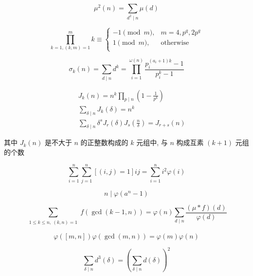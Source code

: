 \begin{equation}
    \mu^2(n) = \sum_{d^2 \mid n} \mu (d)
\end{equation}

\begin{equation}
    \prod_{k=1,(k, m) = 1}^{m} k \equiv
    \begin{cases}
        -1 \pmod m, & m = 4, p^q, 2p^q \\
        1 \pmod m,  & \text{otherwise} \\
    \end{cases}
\end{equation}

\begin{equation}
    \sigma_k(n) = \sum_{d\mid n}d^k = \prod_{i=1}^{\omega(n)}\frac{p_i^{(a_i+1)k}-1}{p_i^k-1}
\end{equation}

\begin{eqnarray}
    &&J_k(n) = n^k\prod_{p\mid n}\left(1-\frac{1}{p^k}\right) \\
    &&\sum_{\delta\mid n}J_k(\delta) = n^k \\
    &&\sum_{\delta\mid n}\delta^sJ_r(\delta)J_s\left(\frac{n}{\delta}\right) = J_{r+s}(n)
\end{eqnarray}

其中 \(J_k(n)\) 是不大于 \(n\) 的正整数构成的 \(k\) 元组中, 与 \(n\) 构成互素 \((k + 1)\) 元组的个数

\begin{equation}
    \sum_{i=1}^{n} \sum_{j=1}^{n} [(i,j)=1]ij =  \sum_{i=1}^{n} i^2\varphi(i)
\end{equation}

\begin{equation}
    n\mid \varphi(a^n-1)
\end{equation}

\begin{equation}
    \sum_{\substack{1 \leq k \leq n,~(k, n) = 1}}f(\gcd(k-1, n)) = \varphi(n)\sum_{d\mid n}\frac{(\mu*f)(d)}{\varphi(d)}
\end{equation}

\begin{equation}
    \varphi([m, n])\varphi(\gcd(m,n)) = \varphi(m)\varphi(n)
\end{equation}

\begin{equation}
    \sum_{\delta\mid n}d^3(\delta) = \left(\sum_{\delta\mid n}d(\delta)\right)^2
\end{equation}

